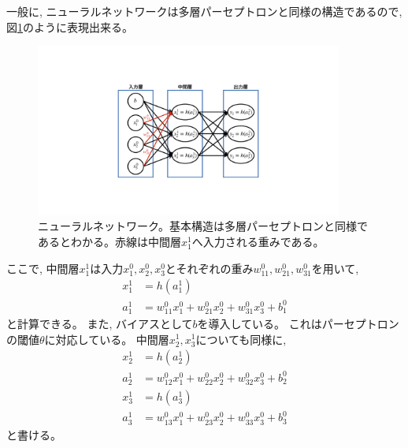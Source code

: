 一般に, ニューラルネットワークは多層パーセプトロンと同様の構造であるので, 図\ref{6NeuralNetwork}のように表現出来る。

\begin{figure}[htbp]
 \centering
 \includegraphics[trim = 250 200 250 200, width=0.9\textwidth, clip]{Figure/2DeepLearning/6NeuralNetwork.png}
 \caption[ニューラルネットワーク]{ニューラルネットワーク。基本構造は多層パーセプトロンと同様であるとわかる。赤線は中間層$x^1_1$へ入力される重みである。}
 \label{6NeuralNetwork}
\end{figure}

ここで, 中間層$x^1_1$は入力$x^0_1,x^0_2,x^0_3$とそれぞれの重み$w^0_{11},w^0_{21},w^0_{31}$を用いて, 
\begin{equation}
 \begin{split}
  x^1_1 &= h(a^1_1)\\
  a^1_1 &= w^0_{11}x^0_1 + w^0_{21}x^0_2 + w^0_{31}x^0_3 + b^0_1
 \end{split}
\end{equation}
と計算できる。
また, バイアスとして$b$を導入している。
これはパーセプトロンの閾値$\theta$に対応している。
中間層$x^1_2,x^1_3$についても同様に, 
\begin{equation}
 \begin{split}
  x^1_2 &= h(a^1_2)\\
  a^1_2 &= w^0_{12}x^0_1 + w^0_{22}x^0_2 + w^0_{32}x^0_3 + b^0_2\\
  x^1_3 &= h(a^1_3)\\
  a^1_3 &= w^0_{13}x^0_1 + w^0_{23}x^0_2 + w^0_{33}x^0_3 + b^0_3
 \end{split}
\end{equation}
と書ける。

